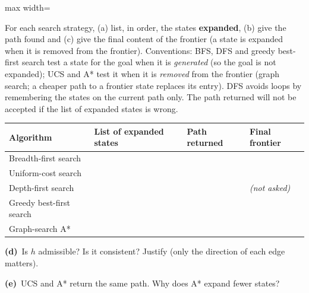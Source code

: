 \documentclass[11pt,a4paper]{article}
\newcommand{\subq}[1]{\par\smallskip\noindent\textbf{#1}\ }
\begin{document}
\begin{center}
\begin{adjustbox}{max width=\linewidth}
\begin{tikzpicture}[scale=1.0, every node/.style={transform shape}, gn/.style={draw, thick, circle, minimum size=7.5mm, inner sep=0pt, font=\small\bfseries}, ec/.style={font=\scriptsize, fill=white, inner sep=1pt}]
\end{tikzpicture}
\end{adjustbox}
\end{center}For each search strategy, (a) list, in order, the states \textbf{expanded}, (b) give the path found and (c) give the final content of the frontier (a state is expanded when it is removed from the frontier). Conventions: BFS, DFS and greedy best-first search test a state for the goal when it is \emph{generated} (so the goal is not expanded); UCS and A* test it when it is \emph{removed} from the frontier (graph search; a cheaper path to a frontier state replaces its entry). DFS avoids loops by remembering the states on the current path only. The path returned will not be accepted if the list of expanded states is wrong.

\begin{center}\small\begin{tabularx}{\linewidth}{|>{\raggedright}p{2.6cm}|>{\raggedright}X|>{\raggedright}p{3.6cm}|>{\raggedright\arraybackslash}p{2.6cm}|}\hline
\textbf{Algorithm} & \textbf{List of expanded states} & \textbf{Path returned} & \textbf{Final frontier}\\ \hline
Breadth-first search & & & \\[8mm] \hline
Uniform-cost search & & & \\[8mm] \hline
Depth-first search & & & \textit{(not asked)}\\[8mm] \hline
Greedy best-first search & & & \\[8mm] \hline
Graph-search A* & & & \\[8mm] \hline
\end{tabularx}\end{center}
\subq{(d)}Is $h$ admissible? Is it consistent? Justify (only the direction of each edge matters).
\begin{ansbox}[height=1.8cm]\end{ansbox}
\subq{(e)}UCS and A* return the same path. Why does A* expand fewer states?
\begin{ansbox}[height=1.5cm]\end{ansbox}
\clearpage
\end{document}

